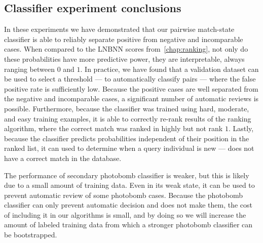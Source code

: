         \ConfusionPhotobomb{}

        \EvalMetricsPhotobomb{}

        \ImportantPBFeat{}

    \FloatBarrier{}
    \subsection{Classifier experiment conclusions}
        In these experiments we have demonstrated that our pairwise match-state classifier is able to reliably
          separate positive from negative and incomparable cases.
        When compared to the LNBNN scores from~\cref{chap:ranking}, not only do these probabilities have more
          predictive power, they are interpretable, always ranging between $0$ and $1$.
        In practice, we have found that a validation dataset can be used to select a threshold --- to
          automatically classify pairs --- where the false positive rate is sufficiently low.
        Because the positive cases are well separated from the negative and incomparable cases, a significant
          number of automatic reviews is possible.
        Furthermore, because the classifier was trained using hard, moderate, and easy training examples, it is
          able to correctly re-rank results of the ranking algorithm, where the correct match was ranked in highly
          but not rank $1$.
        Lastly, because the classifier predicts probabilities independent of their position in the ranked list,
          it can used to determine when a query individual is new --- \ie{} does not have a correct match in the
          database.

        The performance of secondary photobomb classifier is weaker, but this is likely due to a small amount of
          training data.
        Even in its weak state, it can be used to prevent automatic review of some photobomb cases.
        Because the photobomb classifier can only prevent automatic decision and does not make them, the cost of
          including it in our algorithms is small, and by doing so we will increase the amount of labeled training
          data from which a stronger photobomb classifier can be bootstrapped.


